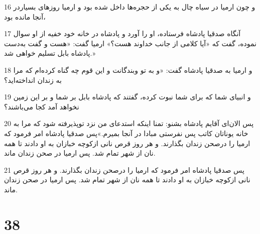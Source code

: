 \par 16 و چون ارمیا در سیاه چال به یکی از حجره‌ها داخل شده بود و ارمیا روزهای بسیاردر آنجا مانده بود،
\par 17 آنگاه صدقیا پادشاه فرستاده، او را آورد و پادشاه در خانه خود خفیه از او سوال نموده، گفت که «آیا کلامی از جانب خداوند هست؟» ارمیا گفت: «هست و گفت به‌دست پادشاه بابل تسلیم خواهی شد.»
\par 18 و ارمیا به صدقیا پادشاه گفت: «و به تو وبندگانت و این قوم چه گناه کرده‌ام که مرا به زندان انداخته‌اید؟
\par 19 و انبیای شما که برای شما نبوت کرده، گفتند که پادشاه بابل بر شما و بر این زمین نخواهد آمد کجا می‌باشند؟
\par 20 پس الان‌ای آقایم پادشاه بشنو: تمنا اینکه استدعای من نزد توپذیرفته شود که مرا به خانه یوناتان کاتب پس نفرستی مبادا در آنجا بمیرم.»پس صدقیا پادشاه امر فرمود که ارمیا را درصحن زندان بگذارند. و هر روز قرص نانی ازکوچه خبازان به او دادند تا همه نان از شهر تمام شد. پس ارمیا در صحن زندان ماند.
\par 21 پس صدقیا پادشاه امر فرمود که ارمیا را درصحن زندان بگذارند. و هر روز قرص نانی ازکوچه خبازان به او دادند تا همه نان از شهر تمام شد. پس ارمیا در صحن زندان ماند.
 
\chapter{38}

